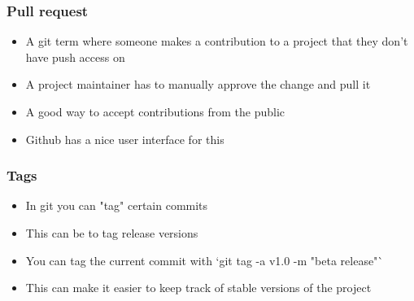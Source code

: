 \documentclass{beamer}
\begin{document}
\begin{frame}
\frametitle{Pull request}
\begin{itemize}
\item A git term where someone makes a contribution to a project that they don't have push access on
\item A project maintainer has to manually approve the change and pull it
\item A good way to accept contributions from the public
\item Github has a nice user interface for this
\end{itemize}
\begin{figure}
\end{figure}
\end{frame}

\begin{frame}
\frametitle{Tags}
\begin{itemize}
\item In git you can "tag" certain commits
\item This can be to tag release versions
\item You can tag the current commit with `git tag -a v1.0 -m "beta release"`
\item This can make it easier to keep track of stable versions of the project
\end{itemize}
\begin{figure}
\end{figure}
\end{frame}
\end{document}
